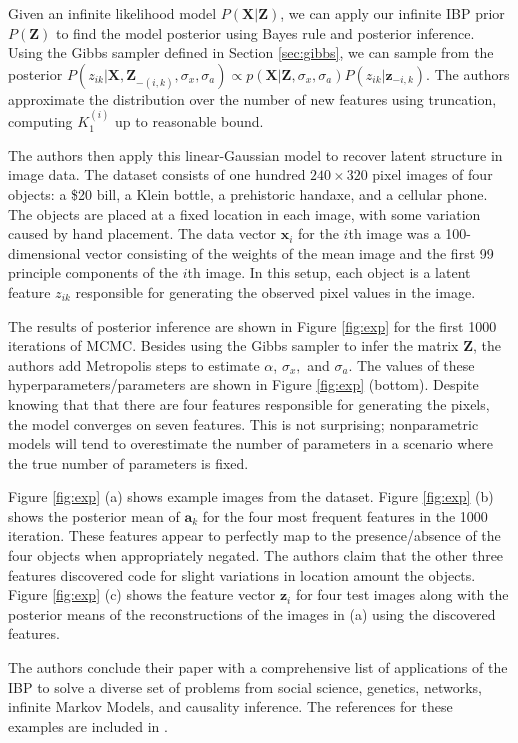 \documentclass[twoside]{article}
\begin{document}
Given an infinite likelihood model $P(\mathbf{X|Z})$, we can apply our infinite IBP prior $P(\mathbf{Z})$ to find the model posterior using Bayes rule and posterior inference. Using the Gibbs sampler defined in Section \ref{sec:gibbs}, we can sample from the posterior $P(z_{ik}|
\mathbf{X, Z}_{-(i,k)}, \sigma_x, \sigma_a) \propto p(\mathbf{X|Z}, \sigma_x, \sigma_a)P(z_{ik}|\mathbf{z}_{-i, k})$. The authors approximate the distribution over the number of new features using truncation, computing $K_1^{(i)}$ up to reasonable bound.

The authors then apply this linear-Gaussian model to recover latent structure in image data. The dataset consists of one hundred $240 \times 320$ pixel images of four objects: a \$20 bill, a Klein bottle, a prehistoric handaxe, and a cellular phone. The objects are placed at a fixed location in each image, with some variation caused by hand placement. The data vector $\mathbf{x}_i$ for the $i$th image was a 100-dimensional vector consisting of the weights of the mean image and the first 99 principle components of the $i$th image. In this setup, each object is a latent feature $z_{ik}$ responsible for generating the observed pixel values in the image.

The results of posterior inference are shown in Figure \ref{fig:exp} for the first 1000 iterations of MCMC. Besides using the Gibbs sampler to infer the matrix $\mathbf{Z}$, the authors add Metropolis steps to estimate $\alpha$, $\sigma_x,$ and $\sigma_a$. The values of these hyperparameters/parameters are shown in Figure \ref{fig:exp} (bottom). Despite knowing that that there are four features responsible for generating the pixels, the model converges on seven features. This is not surprising; nonparametric models will tend to overestimate the number of parameters in a scenario where the true number of parameters is fixed.

Figure \ref{fig:exp} (a) shows example images from the dataset. Figure \ref{fig:exp} (b) shows the posterior mean of $\mathbf{a}_k$ for the four most frequent features in the 1000 iteration. These features appear to perfectly map to the presence/absence of the four objects when appropriately negated. The authors claim that the other three features discovered code for slight variations in location amount the objects.  Figure \ref{fig:exp} (c) shows the feature vector $\mathbf{z}_i$ for four test images along with the posterior means of the reconstructions of the images in (a) using the discovered features.

The authors conclude their paper with a comprehensive list of applications of the IBP to solve a diverse set of problems  from social science, genetics, networks, infinite Markov Models, and causality inference. The references for these examples are included in \citet{Griffiths2011}.



\end{document}

